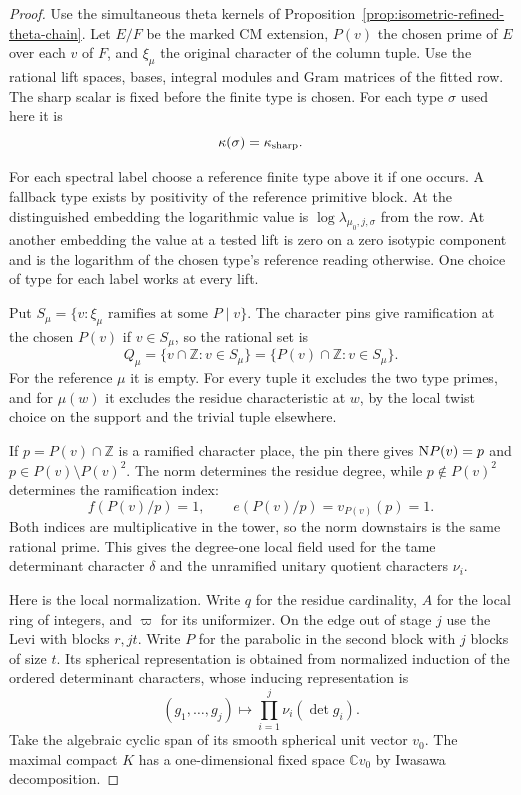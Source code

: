 \begin{proof}
Use the simultaneous theta kernels of
Proposition~\ref{prop:isometric-refined-theta-chain}.
Let \(E/F\) be the marked CM extension, \(P(v)\) the chosen prime
of \(E\) over each \(v\) of \(F\), and \(\xi_\mu\) the
original character of the column tuple. Use the rational lift
spaces, bases, integral modules and Gram matrices of the fitted
row. The sharp scalar is fixed before the finite type is chosen. For each type \(\sigma\) used here it is
\[
 \kappa(\sigma)=\kappa_{\rm sharp}.
\]

For each spectral label choose a reference finite type
above it if one occurs. A fallback type exists by positivity
of the reference primitive block. At the distinguished embedding
the logarithmic value is \(\log\lambda_{\mu_0,j,\sigma}\) from
the row. At another embedding the value at a tested lift is zero
on a zero isotypic component and is the logarithm of the chosen
type's reference reading otherwise. One choice of type for each
label works at every lift.

Put \(S_\mu=\{v:\xi_\mu\text{ ramifies at some }P\mid v\}\).
The character pins give ramification at the chosen \(P(v)\) if
\(v\in S_\mu\), so the rational set is
\[
 Q_\mu=\{v\cap\mathbb Z:v\in S_\mu\}
      =\{P(v)\cap\mathbb Z:v\in S_\mu\}.
\]
For the reference \(\mu\) it is empty. For every tuple it
excludes the two type primes, and for \(\mu(w)\) it excludes
the residue characteristic at \(w\), by the local twist choice
on the support and the trivial tuple elsewhere.

If \(p=P(v)\cap\mathbb Z\) is a ramified character place,
the pin there gives \({\rm N}P(v)=p\) and
\(p\in P(v)\setminus P(v)^2\). The norm determines the residue degree, while \(p\notin P(v)^2\) determines the ramification index:
\[
 f(P(v)/p)=1,\qquad e(P(v)/p)=v_{P(v)}(p)=1 .
\]
Both indices are multiplicative in the tower, so the norm
downstairs is the same rational prime. This gives the
degree-one local field used for the tame determinant character
\(\delta\) and the unramified unitary quotient characters \(\nu_i\).

\label{cor:level-four-core-3}

Here is the local normalization. Write \(q\) for the residue
cardinality, \(A\) for the local ring of integers, and
\(\varpi\) for its uniformizer. On the edge out of stage \(j\)
use the Levi with blocks \(r,jt\). Write \(P\) for the parabolic in the second block with \(j\) blocks of size \(t\). Its spherical representation is obtained from normalized induction of the ordered determinant characters, whose inducing representation is
\[
 (g_1,\ldots,g_j)\longmapsto\prod_{i=1}^j\nu_i(\det g_i).
\] Take the algebraic cyclic span of its smooth spherical unit vector
\(v_0\). The maximal compact \(K\) has a one-dimensional fixed space
\(\mathbb C v_0\) by Iwasawa decomposition.


\end{proof}
